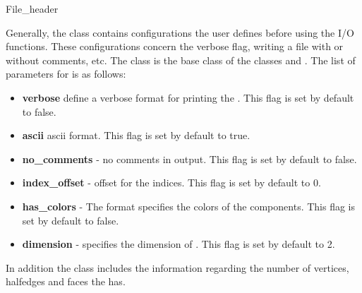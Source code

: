 
\ccRefPageBegin


\begin{ccRefClass}{File_header}


\ccDefinition
Generally, the \ccRefName \/ class contains configurations the user defines before using the I/O functions.
These configurations concern the verbose flag, writing a file with or without comments, etc.
The class is the base class of the classes  and .
The list of parameters for \ccRefName\/ is as follows:

\begin{itemize}
\item {\bf verbose } define a verbose format for printing the . This flag is set by default to false.
\item {\bf ascii} ascii format. This flag is set by default to true.
\item {\bf no\_comments} - no comments in output. This flag is set by default to false.
\item {\bf index\_offset} - offset for the indices. This flag is set by default to 0.
\item {\bf has\_colors} - The format specifies the colors of the  components. This flag is set by default to false.
\item {\bf dimension} - specifies the dimension of . This flag is set by default to 2.
\end{itemize}

In addition the \ccRefName \/ class includes the information regarding the 
number of vertices, halfedges and faces the  has.




\end{ccRefClass}
